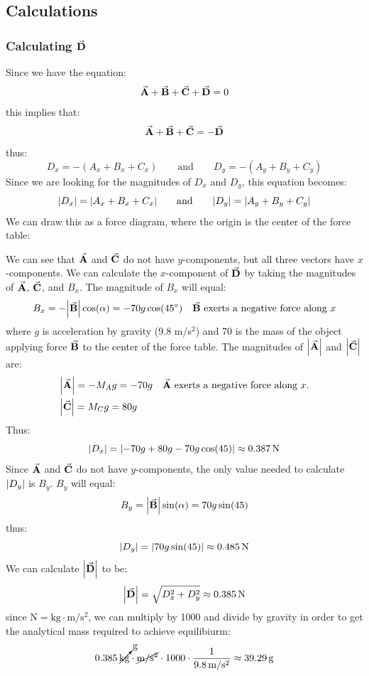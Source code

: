 \documentclass{article}
\begin{document}
\subsection{Calculations}
\subsubsection{Calculating $\va{D}$}\label{calcD}
Since we have the equation:
\[ \va{A} + \va{B} + \va{C} + \va{D} = 0 \]
this implies that:
\[ \va{A} + \va{B} + \va{C} = -\va{D} \]
thus:
\[ D_x = -(A_x+B_x+C_x) \qquad \text{and} \qquad D_y = -(A_y+B_y+C_y)  \]
Since we are looking for the magnitudes of $D_x$ and $D_y$, this equation becomes:
\[ \abs{D_x} = \abs{A_x+B_x+C_x} \qquad \text{and} \qquad \abs{D_y} = \abs{A_y+B_y+C_y}  \]
We can draw this as a force diagram, where the origin is the center of the 
force table:
\begin{figure}[H]
    \centering
\end{figure}
We can see that $\va{A}$ and $\va{C}$ do not have $y$-components, but all three 
vectors have $x$-components. We can calculate the $x$-component of $\va{D}$ by taking the 
magnitudes of $\va{A}$, $\va{C}$, and $B_x$. The magnitude of $B_x$ will equal:
\[ B_x = -\abs{\va{B}}\cos(\alpha) = -70g\cos(\ang{45}) \quad \text{$\va{B}$ exerts a 
negative force along $x$}\]
where $g$ is acceleration by gravity (9.8 m/s$^2$) and 70 is the mass of the object applying force 
$\va{B}$ to the center of the force table. The magnitudes of $\abs{\va{A}}$ and $\abs{\va{C}}$ are:
\begin{align*}
    &\abs{\va{A}} = -M_Ag = -70g \quad \text{$\va{A}$ exerts a negative force along $x$.}\\
    &\abs{\va{C}} = M_Cg = 80g 
\end{align*}
Thus:
\[ \abs{D_x} = \abs{-70g+80g-70g\cos(45)} \approx 0.387\,\mathrm{N} \]
Since $\va{A}$ and $\va{C}$ do not have $y$-components, the only value needed to 
calculate $\abs{D_y}$ is $B_y$. $B_y$ will equal:
\[ B_y = \abs{\va{B}}\sin(\alpha) = 70g\sin(45) \]
thus:
\[ \abs{D_y} = \abs{70g\sin(45)} \approx 0.485\,\mathrm{N} \]
We can calculate $\abs{\va{D}}$ to be:
\[ \abs{\va{D}} = \sqrt{D_x^2 + D_y^2} \approx 0.385\,\mathrm{N} \]
since $\mathrm{N}=\mathrm{kg\cdot m/s^2}$, we can multiply by 1000 and divide by gravity 
in order to get the analytical mass required to achieve equilibiurm:
\[ 0.385\,\cancelto{\mathrm{g}}{\mathrm{kg}}\cdot \cancel{\mathrm{m/s^2}} \cdot 1000 \cdot \frac{1}{9.8\,\mathrm{m/s^2}} \approx 39.29\,\mathrm{g}\]
    
\end{document}
